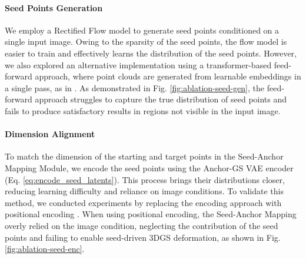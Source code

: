 \paragraph{Seed Points Generation}
We employ a Rectified Flow model to generate seed points conditioned on a single input image. Owing to the sparsity of the seed points, the flow model is easier to train and effectively learns the distribution of the seed points. However, we also explored an alternative implementation using a transformer-based feed-forward approach, where point clouds are generated from learnable embeddings in a single pass, as in \cite{zou2024triplane}. As demonstrated in Fig. \ref{fig:ablation-seed-gen}, the feed-forward approach struggles to capture the true distribution of seed points and fails to produce satisfactory results in regions not visible in the input image.


\paragraph{Dimension Alignment}
To match the dimension of the starting and target points in the Seed-Anchor Mapping Module, we encode the seed points using the Anchor-GS VAE encoder (Eq. \ref{eq:encode_seed_latents}). This process brings their distributions closer, reducing learning difficulty and reliance on image conditions. 
To validate this method, we conducted experiments by replacing the encoding approach with positional encoding .  When using positional encoding, the Seed-Anchor Mapping overly relied on the image condition, neglecting the contribution of the seed points and failing to enable seed-driven 3DGS deformation, as shown in Fig. \ref{fig:ablation-seed-enc}. 

